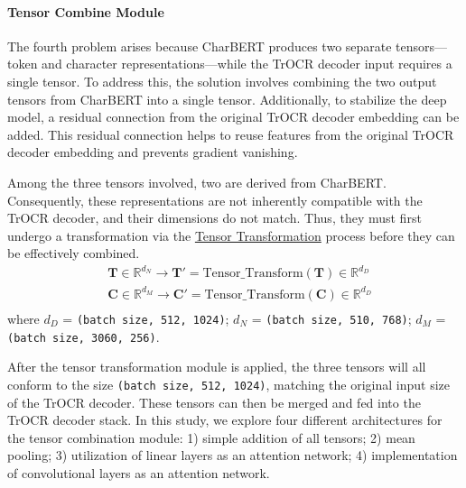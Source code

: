 \paragraph*{Tensor Combine Module}
\label{par:3_tensor_combine}
The fourth problem arises because CharBERT produces two separate tensors—token and character representations—while the TrOCR decoder input requires a single tensor. To address this, the solution involves combining the two output tensors from CharBERT into a single tensor. Additionally, to stabilize the deep model, a residual connection from the original TrOCR decoder embedding can be added. This residual connection helps to reuse features from the original TrOCR decoder embedding and prevents gradient vanishing.

Among the three tensors involved, two are derived from CharBERT. Consequently, these representations are not inherently compatible with the TrOCR decoder, and their dimensions do not match. Thus, they must first undergo a transformation via the \hyperref[par:3_tensor_transform]{Tensor Transformation} process before they can be effectively combined.
\begin{equation} \label{eq:3_tensor_combine_transform}
    \begin{split}
        &\mathbf{T}\in \mathbb{R}^{d_N}\to \mathbf{T}' = \text{Tensor\_Transform}(\mathbf{T})\in \mathbb{R}^{d_D}\\
        &\mathbf{C}\in \mathbb{R}^{d_M}\to \mathbf{C}' = \text{Tensor\_Transform}(\mathbf{C})\in \mathbb{R}^{d_D}\\
    \end{split}
\end{equation}
where $d_D$ = \texttt{(batch size, 512, 1024)}; $d_N$ = \texttt{(batch size, 510, 768)}; $d_M$ = \texttt{(batch size, 3060, 256)}.

After the tensor transformation module is applied, the three tensors will all conform to the size \texttt{(batch size, 512, 1024)}, matching the original input size of the TrOCR decoder. These tensors can then be merged and fed into the TrOCR decoder stack. In this study, we explore four different architectures for the tensor combination module: 1) simple addition of all tensors; 2) mean pooling; 3) utilization of linear layers as an attention network; 4) implementation of convolutional layers as an attention network.

